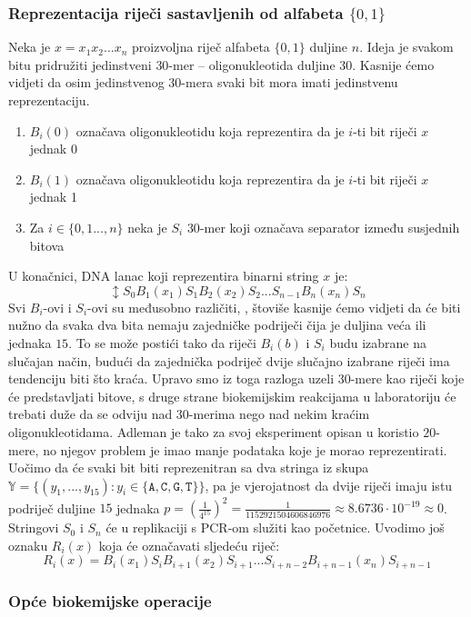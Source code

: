 \documentclass[a4paper,oneside,12pt]{memoir} %
\begin{document}
\begin{spacing}{1.5}
\subsubsection{Reprezentacija riječi sastavljenih od alfabeta $\{0,1\}$}
\label{subsub:repBit}
Neka je $x=x_1x_2...x_n$ proizvoljna riječ alfabeta $\{0,1\}$ duljine $n$. Ideja je svakom bitu pridružiti jedinstveni $30$-mer -- oligonukleotida duljine $30$. Kasnije ćemo vidjeti da osim jedinstvenog $30$-mera svaki bit mora imati jedinstvenu reprezentaciju.
\begin{enumerate}
\item $B_i (0)$ označava oligonukleotidu koja reprezentira da je $i$-ti bit riječi $x$ jednak 0
\item $B_i(1)$ označava oligonukleotidu koja reprezentira da je $i$-ti bit riječi $x$ jednak 1
\item Za $i \in \{0,1...,n\}$ neka je $S_i$ $30$-mer koji označava separator između susjednih bitova
\end{enumerate}   
U konačnici, DNA lanac koji reprezentira binarni string $x$ je:
\[\updownarrow S_0 B_1(x_1)S_1B_2(x_2)S_2...S_{n-1}B_n(x_n)S_n\]
Svi $B_i$-ovi i $S_i$-ovi su međusobno različiti, , štoviše kasnije ćemo vidjeti da će biti nužno da svaka dva bita nemaju zajedničke podriječi čija je duljina veća ili jednaka $15$. To se može postići tako da riječi $B_i(b)$ i $S_i$ budu izabrane na slučajan način, budući da zajednička podriječ dvije slučajno izabrane riječi ima tendenciju biti što kraća. Upravo smo iz toga razloga uzeli $30$-mere kao riječi koje će predstavljati bitove, s druge strane biokemijskim reakcijama u laboratoriju će trebati duže da se odviju nad $30$-merima nego nad nekim kraćim oligonukleotidama. Adleman je tako za svoj eksperiment opisan u \cite{Adleman} koristio $20$-mere, no njegov problem je imao manje podataka koje je morao reprezentirati. Uočimo da će svaki bit biti reprezenitran sa dva stringa iz skupa $\mathbb{Y}=\{(y_1,...,y_15): y_i \in \mathtt{\{A,C,G,T\}\}}$, pa je vjerojatnost da dvije riječi imaju istu podriječ duljine $15$ jednaka $p=\left(\frac{1}{4^{15}}\right)^2=\frac{1}{1152921504606846976}\approx 8.6736 \cdot 10^{-19}\approx 0$. Stringovi $S_0$ i $S_n$ će u replikaciji s PCR-om služiti kao početnice. Uvodimo još oznaku $R_i(x)$ koja će označavati sljedeću riječ:
\[R_i(x)=B_i(x_1)S_iB_{i+1}(x_2)S_{i+1}...S_{i+n-2}B_{i+n-1}(x_n)S_{i+n-1}\]
\subsubsection{Opće biokemijske operacije}

\end{spacing}
\end{document}
